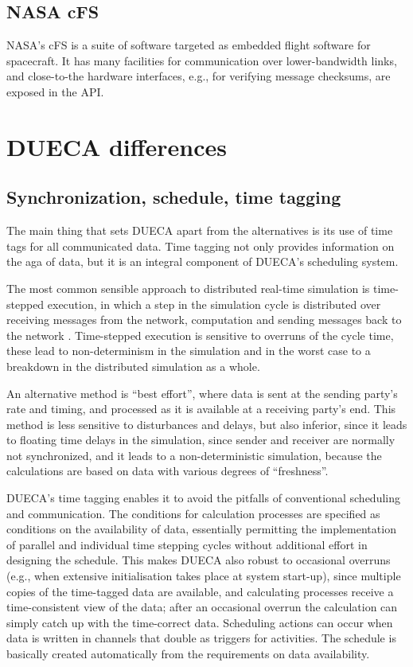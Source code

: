 \documentclass[11pt,a4paper,twoside]{scrreprt}
\begin{document}
\section{NASA cFS}

NASA's cFS is a suite of software targeted as embedded flight software
for spacecraft. It has many facilities for communication over
lower-bandwidth links, and close-to-the hardware interfaces, e.g., for
verifying message checksums, are exposed in the API.

\chapter{DUECA differences}

\section{Synchronization, schedule, time tagging}

The main thing that sets DUECA apart from the alternatives is its use of time tags for all communicated data. Time tagging not only provides information on the aga of data, but it is an integral component of DUECA's scheduling system.

The most common sensible approach to distributed real-time simulation is time-stepped execution, in which a step in the simulation cycle is distributed over receiving messages from the network, computation and sending messages back to the network \cite{mclean_middleware_2004}. Time-stepped execution is sensitive to overruns of the cycle time, these lead to non-determinism in the simulation and in the worst case to a breakdown in the distributed simulation as a whole.

An alternative method is ``best effort'', where data is sent at the sending party's rate and timing, and processed as it is available at a receiving party's end. This method is less sensitive to disturbances and delays, but also inferior, since it leads to floating time delays in the simulation, since sender and receiver are normally not synchronized, and it leads to a non-deterministic simulation, because the calculations are based on data with various degrees of ``freshness''.

DUECA's time tagging enables it to avoid the pitfalls of conventional scheduling and communication. The conditions for calculation processes are specified as conditions on the availability of data, essentially permitting the implementation of parallel and individual time stepping cycles without additional effort in designing the schedule. This makes DUECA also robust to occasional overruns (e.g., when extensive initialisation takes place at system start-up), since multiple copies of the time-tagged data are available, and calculating processes receive a time-consistent view of the data; after an occasional overrun the calculation can simply catch up with the time-correct data. Scheduling actions can occur when data is written in channels that double as triggers for activities. The schedule is basically created automatically from the requirements on data availability.
\end{document}
